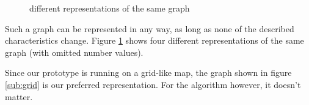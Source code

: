 \begin{figure}[htp]
    \centering
  	\caption{different representations of the same graph}
  	\label{fig:graphs}
\end{figure}

Such a graph can be represented in any way,
as long as none of the described characteristics change.
Figure \ref{fig:graphs} shows four different representations of the same graph (with omitted number values).

Since our prototype is running on a grid-like map,
the graph shown in figure \ref{sub:grid} is our preferred representation.
For the algorithm however, it doesn't matter.
\\\\
